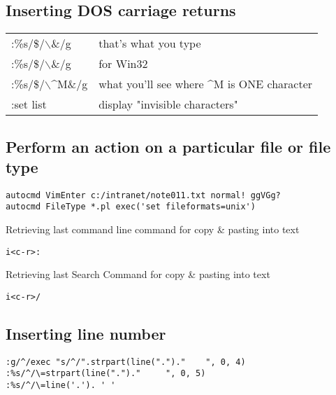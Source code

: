 \subsection{Inserting DOS carriage returns}
\begin{center}
\begin{longtable}{l|l}
 :\%s/\$/$\backslash$\&/g & that's what you type\\
 :\%s/\$/$\backslash$\&/g & for Win32\\
 :\%s/\$/$\backslash$\^{}M\&/g & what you'll see where \^{}M is ONE character\\
 :set list & display "invisible characters"
\end{longtable}
\end{center}

\subsection{Perform an action on a particular file or file type}

\begin{verbatim}
autocmd VimEnter c:/intranet/note011.txt normal! ggVGg?
autocmd FileType *.pl exec('set fileformats=unix')
\end{verbatim}

Retrieving last command line command for copy \& pasting into text
\begin{verbatim}
i<c-r>:
\end{verbatim}

Retrieving last Search Command for copy \& pasting into text
\begin{verbatim}
i<c-r>/
\end{verbatim}

\subsection{Inserting line number}

\begin{verbatim}
:g/^/exec "s/^/".strpart(line(".")."    ", 0, 4)
:%s/^/\=strpart(line(".")."     ", 0, 5)
:%s/^/\=line('.'). ' '
\end{verbatim}


